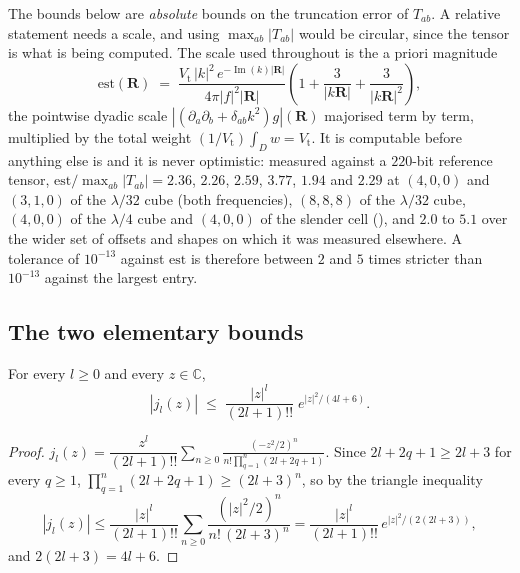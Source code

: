 The bounds below are \emph{absolute} bounds on the truncation error of $T_{ab}$. A
relative statement needs a scale, and using $\max_{ab}|T_{ab}|$ would be circular, since
the tensor is what is being computed. The scale used throughout is the a priori magnitude
\begin{equation}
\mathrm{est}(\mathbf{R}) \;=\;
\frac{V_{\mathrm{t}}\,|k|^2\,e^{-\operatorname{Im}(k)|\mathbf{R}|}}
     {4\pi|f|^2|\mathbf{R}|}
\left(1 + \frac{3}{|k\mathbf{R}|} + \frac{3}{|k\mathbf{R}|^2}\right),
\label{eq:bnd:est}
\end{equation}
the pointwise dyadic scale $|(\partial_a\partial_b+\delta_{ab}k^2)g|(\mathbf{R})$
majorised term by term, multiplied by the total weight
$(1/V_{\mathrm{t}})\int_D w = V_{\mathrm{t}}$. It is computable before anything else is
and it is never optimistic: measured against a $220$-bit reference tensor,
$\mathrm{est}/\max_{ab}|T_{ab}| = 2.36$, $2.26$, $2.59$, $3.77$, $1.94$ and $2.29$ at
$(4,0,0)$ and $(3,1,0)$ of the $\lambda/32$ cube (both frequencies), $(8,8,8)$ of the
$\lambda/32$ cube, $(4,0,0)$ of the $\lambda/4$ cube and $(4,0,0)$ of the slender cell
(), and $2.0$ to $5.1$ over the wider set of offsets and shapes on which it
was measured elsewhere. A tolerance of $10^{-13}$ against $\mathrm{est}$ is therefore
between $2$ and $5$ times stricter than $10^{-13}$ against the largest entry.

\subsection{The two elementary bounds}
\label{sec:bnd:elem}

\begin{theorem}
\label{thm:bnd:j}
For every $l \ge 0$ and every $z \in \mathbb{C}$,
\begin{equation}
|j_l(z)| \;\le\; \frac{|z|^{l}}{(2l+1)!!}\;e^{|z|^{2}/(4l+6)} .
\label{eq:bnd:j}
\end{equation}
\end{theorem}

\begin{proof}
$j_l(z) = \dfrac{z^l}{(2l+1)!!}\displaystyle\sum_{n\ge0}
\frac{(-z^2/2)^n}{n!\prod_{q=1}^{n}(2l+2q+1)}$. Since $2l+2q+1 \ge 2l+3$ for every
$q \ge 1$, $\prod_{q=1}^{n}(2l+2q+1) \ge (2l+3)^n$, so by the triangle inequality
\[
|j_l(z)| \le \frac{|z|^l}{(2l+1)!!}\sum_{n\ge0}\frac{(|z|^2/2)^n}{n!\,(2l+3)^n}
= \frac{|z|^l}{(2l+1)!!}\,e^{|z|^2/(2(2l+3))},
\]
and $2(2l+3) = 4l+6$.
\end{proof}

